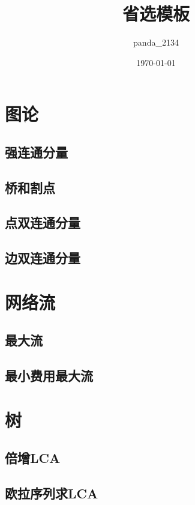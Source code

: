 \documentclass{article}
\title{省选模板}
\author{panda\_2134}
\date{\today}
\begin{document}
	\makeatletter
	\lst@CCPutMacro
    	\@empty\z@\@empty
	\makeatother

	\maketitle
	\newpage
	\tableofcontents
	\newpage

	\section{图论}
		\subsection{强连通分量}
		\subsection{桥和割点}
		\subsection{点双连通分量}
		\subsection{边双连通分量}

	\newpage

	\section{网络流}
		\subsection{最大流}
		

	\subsection{最小费用最大流}

	\newpage

	\section{树}
		\subsection{倍增LCA}
		
		\subsection{欧拉序列求LCA}
		
\end{document}
